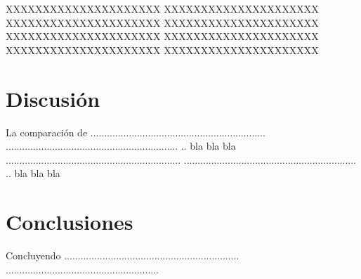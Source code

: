 \documentclass[aps,prl,twocolumn,groupedaddress]{revtex4-2}
\begin{document}
XXXXXXXXXXXXXXXXXXXXX
XXXXXXXXXXXXXXXXXXXXX
XXXXXXXXXXXXXXXXXXXXX
XXXXXXXXXXXXXXXXXXXXX
XXXXXXXXXXXXXXXXXXXXX
XXXXXXXXXXXXXXXXXXXXX
XXXXXXXXXXXXXXXXXXXXX
XXXXXXXXXXXXXXXXXXXXX



\section{Discusión}

La comparación de ................................................................
...............................................................
.. bla bla bla ................................................................
...............................................................
.. bla bla bla

\section{Conclusiones}

Concluyendo ................................................................
........................................................


%


\end{document}
